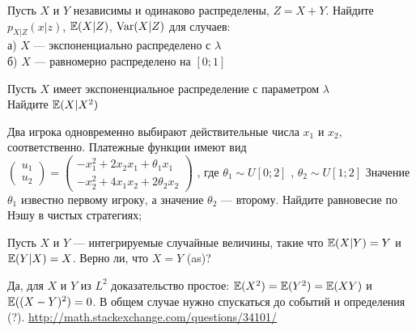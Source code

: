 \begin{problem}
Пусть $X$ и $Y$ независимы и одинаково распределены, $Z=X+Y$. Найдите $p_{X|Z}(x|z)$, $\mathbb{E}(X|Z)$, $\operatorname{Var}(X|Z)$ для случаев: \\
а) $X$ --- экспоненциально распределено с $\lambda$ \\
б) $X$ --- равномерно распределено на $[0;1]$
\end{problem} 
\begin{solution} 

\end{solution}

\begin{problem}
Пусть $X$ имеет экспоненциальное распределение с параметром $\lambda$ \\
Найдите $\mathbb{E}(X|X^{2})$ 
\end{problem} 
\begin{solution} 

\end{solution}

\begin{problem}
Два игрока одновременно выбирают действительные числа  $x_{1} $  и
$x_{2} $, соответственно. Платежные функции имеют вид
 $\left(\begin{array}{l} {u_{1} } \\
 {u_{2} } \end{array}\right)=
 \left(\begin{array}{l} {-x_{1}^{2} +2x_{2} x_{1} +\theta _{1} x_{1} } \\
 {-x_{2}^{2} +4x_{1} x_{2} +2\theta _{2} x_{2} } \end{array}\right)$ ,
 где  $\theta _{1} \sim U\left[0;2\right]$ ,  $\theta _{2} \sim U\left[1;2\right]$
Значение  $\theta _{1} $  известно первому игроку, а значение
$\theta _{2} $  --- второму. Найдите равновесие по Нэшу в чистых
стратегиях; 
\end{problem} 
\begin{solution} 

\end{solution}

\begin{problem}
 Пусть $X$ и $Y$ --- интегрируемые случайные величины, такие что
$\mathbb{E}(X|Y)=Y$ и $\mathbb{E}(Y|X)=X$. Верно ли, что $X=Y$ (as)? 
\end{problem} 
\begin{solution} 
Да, для $X$ и $Y$ из $L^2$ доказательство простое: $\mathbb{E}(X^2)=\mathbb{E}(Y^2)=\mathbb{E}(XY)$ и $\mathbb{E}((X-Y)^2)=0$. В общем случае нужно спускаться до событий и определения (?). 
\url{http://math.stackexchange.com/questions/34101/}

\end{solution}

